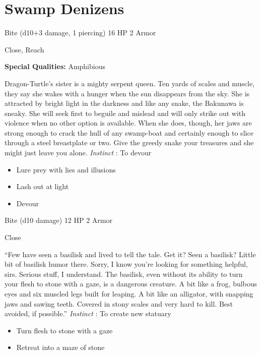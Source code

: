 \section{Swamp Denizens}




 Bite (d10+3 damage, 1 piercing) 16 HP 2 Armor


 Close, Reach


 \textbf{Special Qualities:}
 Amphibious


 Dragon-Turtle's sister is a mighty serpent queen. Ten yards of scales and muscle, they say she wakes with a hunger when the sun disappears from the sky. She is attracted by bright light in the darkness and like any snake, the Bakunawa is sneaky. She will seek first to beguile and mislead and will only strike out with violence when no other option is available. When she does, though, her jaws are strong enough to crack the hull of any swamp-boat and certainly enough to slice through a steel breastplate or two. Give the greedy snake your treasures and she might just leave you alone. \emph{Instinct}
: To devour
\begin{itemize}
\item Lure prey with lies and illusions
\item Lash out at light
\item Devour

\end{itemize}




 Bite (d10 damage) 12 HP 2 Armor


 Close


 ``Few have seen a basilisk and lived to tell the tale. Get it? Seen a basilisk? Little bit of basilisk humor there. Sorry, I know you're looking for something helpful, sirs. Serious stuff, I understand. The basilisk, even without its ability to turn your flesh to stone with a gaze, is a dangerous creature. A bit like a frog, bulbous eyes and six muscled legs built for leaping. A bit like an alligator, with snapping jaws and sawing teeth. Covered in stony scales and very hard to kill. Best avoided, if possible.'' \emph{Instinct}
: To create new statuary
\begin{itemize}
\item Turn flesh to stone with a gaze
\item Retreat into a maze of stone

\end{itemize}


